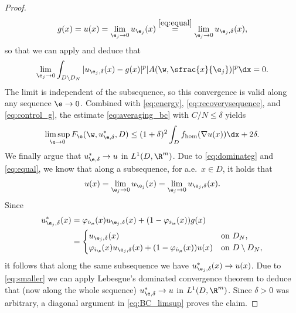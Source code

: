 \begin{proof}
\begin{equation*}
g(x)=u(x)=\lim_{\e_j\to 0}u_{\e_j}(x)\overset{\eqref{eq:equal}}{=}\lim_{\e_j\to 0}u_{\e_j,\delta}(x),
\end{equation*}
so that we can apply \cite[Prop.\,2.61]{FoLe} and deduce that
\begin{equation*}
\lim_{\e_j\to 0}\int_{D\setminus D_N}|u_{\e_j,\delta}(x)-g(x)|^p|A(\w,\sfrac{x}{\e_j})|^p\dx=0.
\end{equation*}
The limit is independent of the subsequence, so this convergence is valid along any sequence $\e\to 0$. Combined with \eqref{eq:energy}, \eqref{eq:recoverysequence}, and \eqref{eq:control_g}, the estimate \eqref{eq:averaging_bc} with $C/N\leq\delta$ yields
\begin{equation}\label{eq:BC_limsup}
\limsup_{\e\to 0} F_{\e}(\w,u_{\e,\delta}^*,D)\leq (1+\delta)^2\int_D f_{\hom}(\nabla u(x))\dx+2\delta.
\end{equation}
We finally argue that $u_{\e,\delta}^*\to u$ in $L^1(D,\R^m)$. Due to \eqref{eq:dominateg} and \eqref{eq:equal}, we know that along a subsequence, for a.e.\ $x\in D$, it holds that
\begin{equation*}
u(x)=\lim_{\e_j\to 0}u_{\e_j}(x)=\lim_{\e_j\to 0}u_{\e_j,\delta}(x).
\end{equation*}
Since
\begin{align*}
u_{\e_j,\delta}^*(x)&=\varphi_{i_{\e}}(x)u_{\e_j,\delta}(x)+(1-\varphi_{i_{\e}}(x))g(x)
\\
&=
\begin{cases}
u_{\e_j,\delta}(x)&\mbox{on $D_N$},
\\
\varphi_{i_{\e}}(x)u_{\e_j,\delta}(x)+(1-\varphi_{i_{\e}}(x))u(x) &\mbox{on $D\setminus D_{N}$,}
\end{cases}
\end{align*}
it follows that along the same subsequence we have $u_{\e_j,\delta}^*(x)\to u(x)$. Due to \eqref{eq:smaller} we can apply Lebesgue's dominated convergence theorem to deduce that (now along the whole sequence) $u_{\e,\delta}^*\to u$ in $L^1(D,\R^m)$. Since $\delta>0$ was arbitrary, a diagonal argument in \eqref{eq:BC_limsup} proves the claim.
\end{proof}
